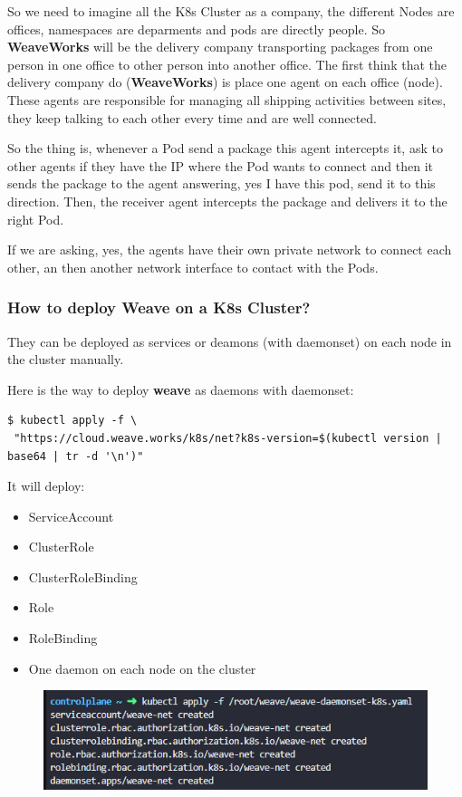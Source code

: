 \documentclass{article}
\newenvironment{codetemplate}[1][]{%
  \mybasecolorbox[#1]
  \itshape
}{%
  \endmybasecolorbox
}
\begin{document}
So we need to imagine all the K8s Cluster as a company, the different Nodes are offices, namespaces are deparments and pods are directly people. So \textbf{WeaveWorks} will be the delivery company transporting packages from one person in one office to other person into another office. The first think that the
delivery company do (\textbf{WeaveWorks}) is place one agent on each office (node). These agents are responsible for managing all shipping activities between sites, they keep talking to each other every time and are well connected.

So the thing is, whenever a Pod send a package this agent intercepts it, ask to other agents if they have the IP where the Pod wants to connect and then it sends the package to the agent answering, yes I have this pod, send it to this direction. Then, the receiver agent intercepts the package and delivers it to the right Pod.

If we are asking, yes, the agents have their own private network to connect each other, an then another network interface to contact with the Pods.

\subsubsection{How to deploy Weave on a K8s Cluster?}
They can be deployed as services or deamons (with daemonset) on each node in the cluster manually.

Here is the way to deploy \textbf{weave} as daemons with daemonset:
\begin{codetemplate}{}
\begin{verbatim}
$ kubectl apply -f \
 "https://cloud.weave.works/k8s/net?k8s-version=$(kubectl version | base64 | tr -d '\n')"
\end{verbatim}
\end{codetemplate}

It will deploy:
\begin{itemize}
    \item ServiceAccount
    \item ClusterRole
    \item ClusterRoleBinding
    \item Role
    \item RoleBinding
    \item One daemon on each node on the cluster
\end{itemize}

\begin{figure}[H]
    \centering
    \includegraphics[width=\textwidth]{pictures/weave.png}
\end{figure}
\end{document}
